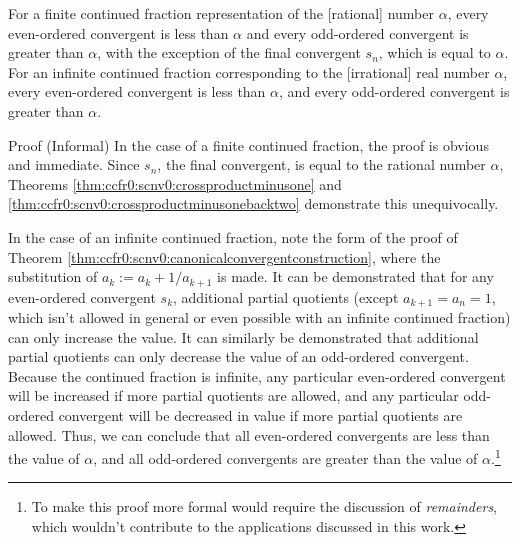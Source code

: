 \begin{vworktheoremstatement}
\label{thm:ccfr0:scnv0:evenslessthanoddsgreaterthan}
For a finite continued fraction representation of
the [rational] number $\alpha$, every even-ordered convergent
is less than $\alpha$ and every odd-ordered convergent is
greater than $\alpha$, with the exception of the final convergent
$s_n$, which is equal to $\alpha$.
For an infinite continued fraction corresponding to the 
[irrational] real
number $\alpha$, every even-ordered convergent is less than
$\alpha$, and every odd-ordered convergent is greater than 
$\alpha$.  
\end{vworktheoremstatement}
\begin{vworktheoremparsection}{Proof (Informal)}
In the case of a finite continued fraction, the proof is obvious
and immediate.  Since $s_n$, the final convergent, is equal
to the rational number $\alpha$, Theorems \ref{thm:ccfr0:scnv0:crossproductminusone}
and \ref{thm:ccfr0:scnv0:crossproductminusonebacktwo} demonstrate this
unequivocally.

In the case of an infinite continued fraction,
note the form of the proof of Theorem 
\ref{thm:ccfr0:scnv0:canonicalconvergentconstruction},
where the substitution of $a_k := a_k + 1/a_{k+1}$
is made.  It can be demonstrated that for any even-ordered
convergent $s_k$, additional partial quotients (except
$a_{k+1} = a_n = 1$, which isn't allowed in general or even
possible with an infinite continued fraction) can only 
increase the value.  It can similarly be demonstrated that 
additional partial quotients can only decrease the value
of an odd-ordered convergent.  Because the continued fraction
is infinite, any particular even-ordered convergent will be
increased if more partial quotients are allowed, and any particular
odd-ordered convergent will be decreased in value if more
partial quotients are allowed.  Thus, we can conclude that
all even-ordered convergents are less than the value of 
$\alpha$, and all odd-ordered convergents are greater
than the value of $\alpha$.\footnote{To make this proof more
formal would require the discussion of \emph{remainders},
which wouldn't contribute to the applications discussed in this
work.}
\end{vworktheoremparsection}

